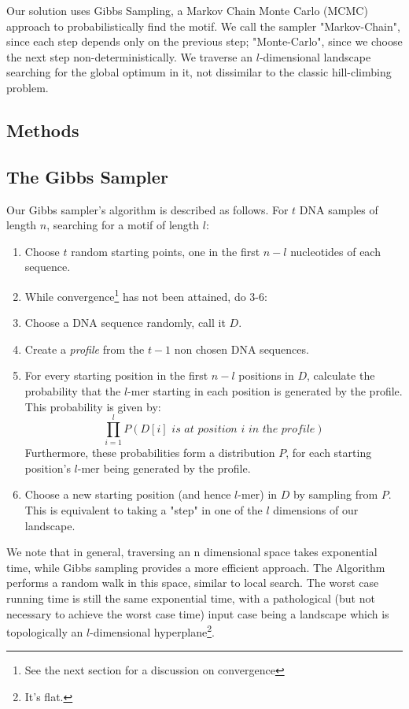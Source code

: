 \documentclass{bioinfo}
\begin{document}
Our solution uses Gibbs Sampling, a Markov Chain Monte Carlo (MCMC) approach to probabilistically find the motif. We call the sampler "Markov-Chain", since each step depends only on the previous step; "Monte-Carlo", since we choose the next step non-deterministically. We traverse an $l$-dimensional landscape searching for the global optimum in it, not dissimilar to the classic hill-climbing problem.
\begin{methods}
\section{Methods}
\subsection{The Gibbs Sampler}
Our Gibbs sampler's algorithm is described as follows.
For $t$ DNA samples of length $n$, searching for a motif of length $l$:\\
\begin{enumerate}
    \item Choose $t$ random starting points, one in the first $n - l$ nucleotides of each sequence.
    
    \item While convergence\footnote{See the next section for a discussion on convergence} has not been attained, do 3-6:
    \item Choose a DNA sequence randomly, call it $D$.
    \item Create a \textit{profile} from the $t - 1$ non chosen DNA sequences.
    \item For every starting position in the first $n - l$ positions in $D$, calculate the probability that the $l$-mer starting in each position is generated by the profile. This probability is given by:
        \begin{equation}
            \prod_{i=1}^l P(D[i] \textit{ is at position } i \textit{ in the profile})
        \end{equation}
    Furthermore, these probabilities form a distribution $P$, for each starting position's $l$-mer being generated by the profile.
\item Choose a new starting position (and hence $l$-mer) in $D$ by sampling from $P$. This is equivalent to taking a "step" in one of the $l$ dimensions of our landscape.
\end{enumerate}

We note that in general, traversing an n dimensional space takes exponential time, while Gibbs sampling provides a more efficient approach. The Algorithm performs a random walk in this space, similar to local search. The worst case running time is still the same exponential time, with a pathological (but not necessary to achieve the worst case time) input case being a landscape which is topologically an $l$-dimensional hyperplane\footnote{It's flat.}.

\end{methods}
\end{document}
